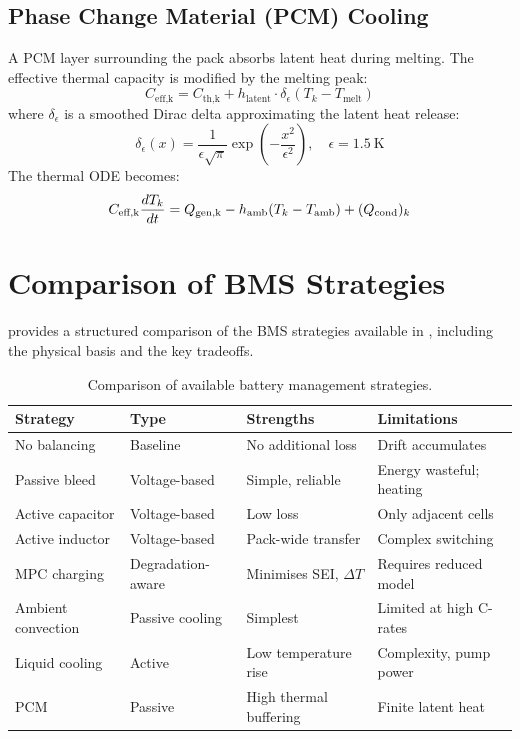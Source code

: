 \subsection{Phase Change Material (PCM) Cooling}

A PCM layer surrounding the pack absorbs latent heat during melting. The effective thermal capacity is modified by the melting peak:
\begin{equation}
  C_\text{eff,k} = C_\text{th,k} + h_\text{latent} \cdot \delta_\epsilon(T_k - T_\text{melt})
  \label{eq:pcm_capacity}
\end{equation}
where $\delta_\epsilon$ is a smoothed Dirac delta approximating the latent heat release:
\begin{equation}
  \delta_\epsilon(x) = \frac{1}{\epsilon\sqrt{\pi}} \exp\!\left(-\frac{x^2}{\epsilon^2}\right), \quad \epsilon = 1.5~\text{K}
  \label{eq:smoothed_delta}
\end{equation}
The thermal ODE becomes:
\begin{equation}
  C_\text{eff,k} \dfrac{d T_k}{dt} = Q_\text{gen,k} - h_\text{amb}(T_k - T_\text{amb}) + (Q_\text{cond})_k
  \label{eq:pcm_thermal_ode}
\end{equation}

\section{Comparison of BMS Strategies}
\label{sec:bms_comparison}

 provides a structured comparison of the BMS strategies available in \VIBE{}, including the physical basis and the key tradeoffs.

\begin{table}[H]
\centering
\caption{Comparison of available battery management strategies.}
\label{tab:bms_strategy_comparison}
\small
\begin{tabular}{p{3.0cm}p{3.0cm}p{3.2cm}p{3.5cm}}
\toprule
\textbf{Strategy} & \textbf{Type} & \textbf{Strengths} & \textbf{Limitations} \\
\midrule
No balancing & Baseline & No additional loss & Drift accumulates \\
Passive bleed & Voltage-based & Simple, reliable & Energy wasteful; heating \\
Active capacitor & Voltage-based & Low loss & Only adjacent cells \\
Active inductor & Voltage-based & Pack-wide transfer & Complex switching \\
MPC charging & Degradation-aware & Minimises SEI, $\Delta T$ & Requires reduced model \\
\midrule
Ambient convection & Passive cooling & Simplest & Limited at high C-rates \\
Liquid cooling & Active & Low temperature rise & Complexity, pump power \\
PCM & Passive & High thermal buffering & Finite latent heat \\
\bottomrule
\end{tabular}
\end{table}

